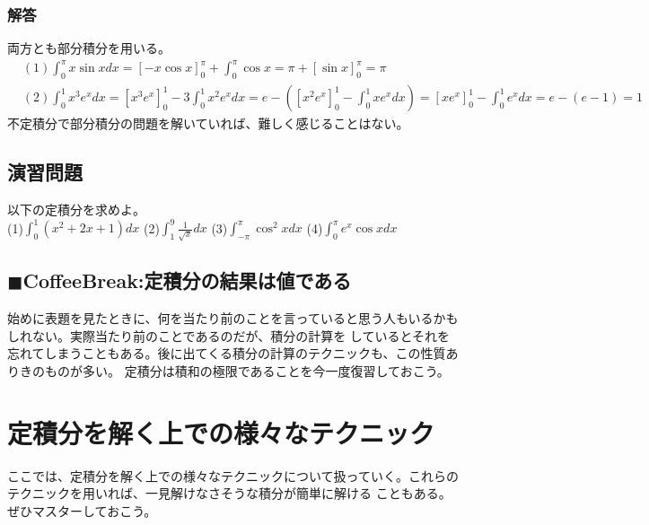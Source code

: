 \documentclass[a4j,dvipdfmx]{jsarticle}
\begin{document}
\subsubsection*{解答}
両方とも部分積分を用いる。
\begin{align*}
    &(1)\int_0^\pi x\sin xdx=\left[-x\cos x\right]_0^\pi +\int_0^\pi\cos x=\pi+\left[\sin x\right]_0^\pi=\pi\\
    &(2)\int_0^1 x^3e^xdx=[x^3e^x]_0^1-3\int_0^1x^2e^xdx=e-([x^2e^x]_0^1-\int_0^1xe^xdx)=[xe^x]_0^1-\int_0^1e^xdx=e-(e-1)=1
\end{align*}
不定積分で部分積分の問題を解いていれば、難しく感じることはない。
\subsection{演習問題}
以下の定積分を求めよ。\\

(1)$\displaystyle \int_0^1 (x^2+2x+1)dx$
\hspace{10mm}
(2)$\displaystyle \int_1^9 \frac{1}{\sqrt{x}}dx$
\hspace{10mm}
(3)$\displaystyle \int_{-\pi}^\pi \cos^2 xdx$
\hspace{10mm}
(4)$\displaystyle \int_0^\pi e^x\cos xdx$

\hrulefill
\subsection{$\blacksquare$CoffeeBreak:定積分の結果は値である}
\begin{screen}
    始めに表題を見たときに、何を当たり前のことを言っていると思う人もいるかもしれない。実際当たり前のことであるのだが、積分の計算を
    しているとそれを忘れてしまうこともある。後に出てくる積分の計算のテクニックも、この性質ありきのものが多い。
    定積分は積和の極限であることを今一度復習しておこう。
\end{screen}
\newpage
\section{定積分を解く上での様々なテクニック}
ここでは、定積分を解く上での様々なテクニックについて扱っていく。これらのテクニックを用いれば、一見解けなさそうな積分が簡単に解ける
こともある。ぜひマスターしておこう。
\end{document}
